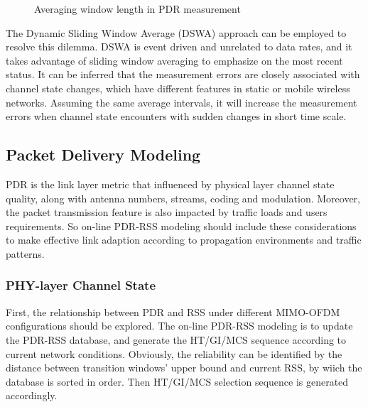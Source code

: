 \documentclass[draftclsnofoot,journal,onecolumn,11pt]{IEEEtran}
\begin{document}
\begin{figure}[!htp]
\centerline{
}
\caption{Averaging window length in PDR measurement}
\label{method}
\end{figure}

The Dynamic Sliding Window Average (DSWA) approach can be employed to resolve this dilemma. DSWA is event driven and unrelated to data rates, and it takes advantage of sliding window averaging to emphasize on the most recent status. It can be inferred that the measurement errors are closely associated with channel state changes, which have different features in static or mobile wireless networks. Assuming the same average intervals, it will increase the measurement errors when channel state encounters with sudden changes in short time scale.

\subsection{Packet Delivery Modeling} \label{sect:modeling}

PDR is the link layer metric that influenced by physical layer channel state quality, along with antenna numbers, streams, coding and modulation. Moreover, the packet transmission feature is also impacted by traffic loads and users requirements. So on-line PDR-RSS modeling should include these considerations to make effective link adaption according to propagation environments and traffic patterns.

\subsubsection{PHY-layer Channel State}
First, the relationship between PDR and RSS under different MIMO-OFDM configurations should be explored. The on-line PDR-RSS modeling is to update the PDR-RSS database, and generate the HT/GI/MCS sequence according to current network conditions. Obviously, the reliability can be identified by the distance between transition windows' upper bound and current RSS, by wiich the database is sorted in order. Then HT/GI/MCS selection sequence is generated accordingly.
\end{document}
